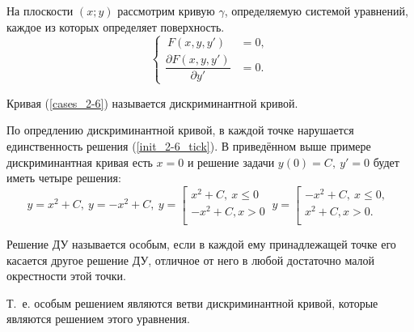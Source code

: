 	На плоскости $(x; y)$ рассмотрим кривую $\gamma$, определяемую системой уравнений, каждое из которых определяет поверхность.
	\begin{equation}\label{cases_2-6}
	    \begin{cases}
	        \ F(x, y, y') & = 0, \\
	        \dfrac{\partial F(x, y, y')}{\partial y'} & = 0.
	    \end{cases}
	\end{equation}
	\begin{definition}
	    Кривая (\ref{cases_2-6}) называется дискриминантной кривой.
	\end{definition}
	\begin{remark}
	    По опредлению дискриминантной кривой, в каждой точке нарушается единственность решения (\ref{init_2-6_tick}). В приведённом выше примере дискриминантная кривая есть $x = 0$ и решение задачи $y(0) = C,\ y' = 0$ будет иметь четыре решения:
	    \begin{equation*}
	        y = x^2 + C,\ y = -x^2 + C,\ 
	        y = 
            \left[ 
                \begin{gathered} 
                    x^2 + C,\ x \leq 0\\
                    -x^2 + C, x > 0\\ 
                \end{gathered} 
            \right.\
            y = 
            \left[ 
                \begin{gathered} 
                    -x^2 + C,\ x \leq 0,\\
                    x^2 + C, x > 0.\\ 
                \end{gathered} 
            \right.\
	    \end{equation*}
	\end{remark}
	\begin{definition}
	    Решение ДУ называется особым, если в каждой ему принадлежащей точке его касается другое решение ДУ, отличное от него в любой достаточно малой окрестности этой точки.
	\end{definition}
	\begin{remark}
	    Т.\ е. особым решением являются ветви дискриминантной кривой, которые являются решением этого уравнения.
	    
	\end{remark}
	

